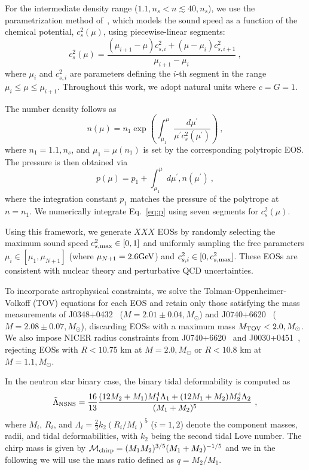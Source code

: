 \documentclass[twocolumn]{aastex631}
\begin{document}
	For the intermediate density range ($1.1,n_s < n \lesssim 40,n_s$), we use the parametrization method of~\citet{Annala2019}, which models the sound speed as a function of the chemical potential, $c_s^2(\mu)$, using piecewise-linear segments:
	\begin{equation} \label{eq:cs2}
		c_s^2(\mu) = \frac{\left(\mu_{i+1}-\mu \right) c_{s,i}^2 + \left(\mu - \mu_i \right) c_{s,i+1}^2}{\mu_{i+1}-\mu_i}~, 
	\end{equation}
	where $\mu_i$ and $c_{s,i}^2$ are parameters defining the $i$-th segment in the range $\mu_i \leq \mu \leq \mu_{i+1}$.
	Throughout this work, we adopt natural units where $c=G=1$.
	
	The number density follows as 
	\begin{equation} \label{eq:n}
		n(\mu) = n_1 \exp \left({\int_{\mu_1}^\mu \frac{d\mu^\prime}{\mu^\prime c_s^2(\mu^\prime)}}\right)~, 
	\end{equation} where $n_1 = 1.1,n_s$, and $\mu_1 = \mu(n_1)$ is set by the corresponding polytropic EOS.
	The pressure is then obtained via
	\begin{equation} \label{eq:p}
		p(\mu) = p_1 + \int_{\mu_1}^\mu d\mu^\prime , n(\mu^\prime)~,
	\end{equation}
	where the integration constant $p_1$ matches the pressure of the polytrope at $n = n_1$.
	We numerically integrate Eq.~\eqref{eq:p} using seven segments for $c_s^2(\mu)$.
	
	Using this framework, we generate $XXX$ EOSs by randomly selecting the maximum sound speed $c_{s,{\rm max}}^2 \in [0,1]$ and uniformly sampling the free parameters $\mu_i \in [\mu_1, \mu_{N+1}]$ (where $\mu_{N+1} = 2.6\rm GeV$) and $c_{s,i}^2 \in [0, c_{s,{\rm max}}^2]$. These EOSs are consistent with nuclear theory and perturbative QCD uncertainties.
	
	To incorporate astrophysical constraints, we solve the Tolman-Oppenheimer-Volkoff (TOV) equations for each EOS and retain only those satisfying the mass measurements of J0348+0432~\citep{Antoniadis2013} ($M = 2.01\pm 0.04,M_{\odot}$) and J0740+6620~\citep{Cromartie2019, Fonseca2021} ($M = 2.08 \pm 0.07,M_{\odot}$), discarding EOSs with a maximum mass $M_{\rm TOV} < 2.0,M_{\odot}$. We also impose NICER radius constraints from J0740+6620~\citep{Miller2021, Riley2021} and J0030+0451~\citep{Riley2019, MCMiller2019b}, rejecting EOSs with $R < 10.75$ km at $M = 2.0,M_{\odot}$ or $R < 10.8$ km at $M = 1.1,M_{\odot}$.
	
	In the neutron star binary case, the binary tidal deformability is computed as
	\begin{equation} 
		\tilde{\Lambda}_{\rm NSNS} = \frac{16}{13} \frac{ (12M_2 + M_1) M_1^4 \Lambda_1 + (12M_1 + M_2) M_2^4 \Lambda_2}{(M_1 + M_2)^5}~,
	\end{equation}
	where $M_i$, $R_i$, and $\Lambda_i = \frac{2}{3} k_2 \left( R_i/M_i \right)^5$ ($i=1,2$) denote the component masses, radii, and tidal deformabilities, with $k_2$ being the second tidal Love number.
	The chirp mass is given by $\mathcal{M}_{\rm chirp} = (M_1 M_2)^{3/5} (M_1+M_2)^{-1/5}$ and we in the following we will use the mass ratio defined as $q = M_2/M_1$.
	
\end{document}
